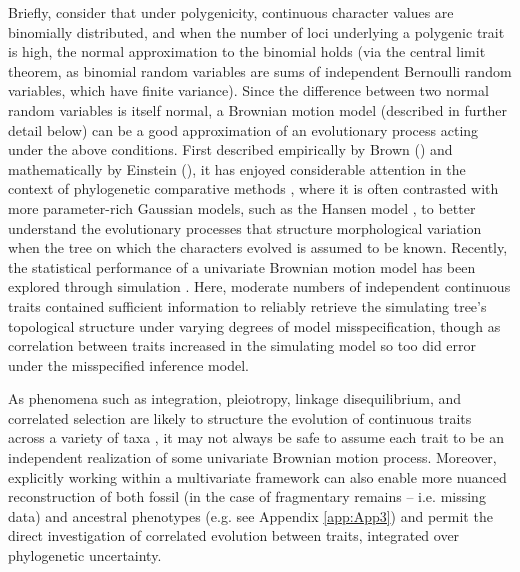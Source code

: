 Briefly, consider that under polygenicity, continuous character values are binomially distributed, and when the number of loci underlying a polygenic trait is high, the normal approximation to the binomial holds (via the central limit theorem, as binomial random variables are sums of independent Bernoulli random variables, which have finite variance). Since the difference between two normal random variables is itself normal, a Brownian motion model (described in further detail below) can be a good approximation of an evolutionary process acting under the above conditions. First described empirically by Brown (\citeyear{brownXXVIIBriefAccount1828}) and mathematically by Einstein (\citeyear{einsteinInvestigationsTheoryBrownian1956}), it has enjoyed considerable attention in the context of phylogenetic comparative methods \citep{felsensteinPhylogeniesComparativeMethod1985}, where it is often contrasted with more parameter-rich Gaussian models, such as the Hansen model \citep{butlerPhylogeneticComparativeAnalysis2004, beaulieuModelingStabilizingSelection2012}, to better understand the evolutionary processes that structure morphological variation when the tree on which the characters evolved is assumed to be known. Recently, the statistical performance of a univariate Brownian motion model has been explored through simulation \citep{parins-fukuchiUseContinuousTraits2017}. Here, moderate numbers of independent continuous traits contained sufficient information to reliably retrieve the simulating tree’s topological structure under varying degrees of model misspecification, though as correlation between traits increased in the simulating model so too did error under the misspecified inference model.

As phenomena such as integration, pleiotropy, linkage disequilibrium, and correlated selection are likely to structure the evolution of continuous traits \citep{cheverudDevelopmentalIntegrationEvolution1996, youngEvolutionaryPersistencePhenotypic2006, mitteroeckerConceptualStatisticalRelationship2007, klingenbergMorphologicalIntegrationDevelopmental2008, klingenbergStudyingMorphologicalIntegration2014} across a variety of taxa \citep[e.g.][]{parsonsConstraintOpportunityGenetic2011, klingenbergDevelopmentalPlasticityMorphological2012, neauxBasicraniumFaceAssessing2018}, it may not always be safe to assume each trait to be an independent realization of some univariate Brownian motion process.  Moreover, explicitly working within a multivariate framework can also enable more nuanced reconstruction of both fossil (in the case of fragmentary remains – i.e. missing data) and ancestral phenotypes (e.g. see Appendix \ref{app:App3}) and permit the direct investigation of correlated evolution between traits, integrated over phylogenetic uncertainty.

